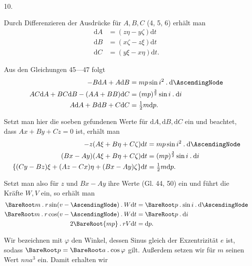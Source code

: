 \par{}\bigskip
{}
\begin{center}10.\end{center}
\noindent\hspace*{\parindent}Durch Differenzieren der Ausdrücke für \(A,B,C\) (4, 5, 6) erhält man
\[
\begin{aligned}
\mathrm{d}A&=(z\eta-y\zeta)\mathrm{d}t\\
\mathrm{d}B&=(x\zeta-z\xi)\mathrm{d}t\\
\mathrm{d}C&=(y\xi-x\eta)\mathrm{d}t.
\end{aligned}
\]
\par Aus den Gleichungen 45—47 folgt
\[
\begin{aligned}
-B\mathrm{d}A+A\mathrm{d}B&=mp\sin i^2\mathbin{.}\mathrm{d}\AscendingNode\\
AC\mathrm{d}A+BC\mathrm{d}B-(AA+BB)\mathrm{d}C&=(mp)^{\frac32}\sin i\mathbin{.}\mathrm{d}i\\
A\mathrm{d}A+B\mathrm{d}B+C\mathrm{d}C&=\tfrac12m\mathrm{d}p.
\end{aligned}
\]
\par Setzt man hier die soeben gefundenen Werte für \(\mathrm{d}A,\mathrm{d}B,\mathrm{d}C\) ein und beachtet, dass \(Ax+By+Cz=0\) ist, erhält man
\[
\begin{aligned}
-z(A\xi+B\eta+C\zeta)\mathrm{d}t&=mp\sin i^2\mathbin{.}\mathrm{d}\AscendingNode\\
(Bx-Ay)(A\xi+B\eta+C\zeta)\mathrm{d}t&=(mp)^{\frac32}\sin i\mathbin{.}\mathrm{d}i\\
\{(Cy-Bz)\xi+(Az-Cx)\eta+(Bx-Ay)\zeta\}\mathrm{d}t&=\tfrac12m\mathrm{d}p.
\end{aligned}
\]
\par Setzt man also für \(z\) und \(Bx-Ay\) ihre Werte (Gl. 44, 50) ein und führt die Kräfte \(W,V\) ein, so erhält man
\[
\begin{aligned}
\BareRoot m\mathbin{.}r\sin(v-\AscendingNode)\mathbin{.}W\mathrm{d}t&=\BareRoot p\mathbin{.}\sin i\mathbin{.}\mathrm{d}\AscendingNode\\
\BareRoot m\mathbin{.}r\cos(v-\AscendingNode)\mathbin{.}W\mathrm{d}t&=\BareRoot p\mathbin{.}\mathrm{d}i\\
2\BareRoot{mp}\mathbin{.}rV\mathrm{d}t&=\mathrm{d}p.
\end{aligned}
\]
\par Wir bezeichnen mit \(\varphi\) den Winkel, dessen Sinus gleich der Exzentrizität \(e\) ist, sodass \(\BareRoot p=\BareRoot a\mathbin{.}\cos\varphi\) gilt. Außerdem setzen wir für \(m\) seinen Wert \(nna^3\) ein. Damit erhalten wir
